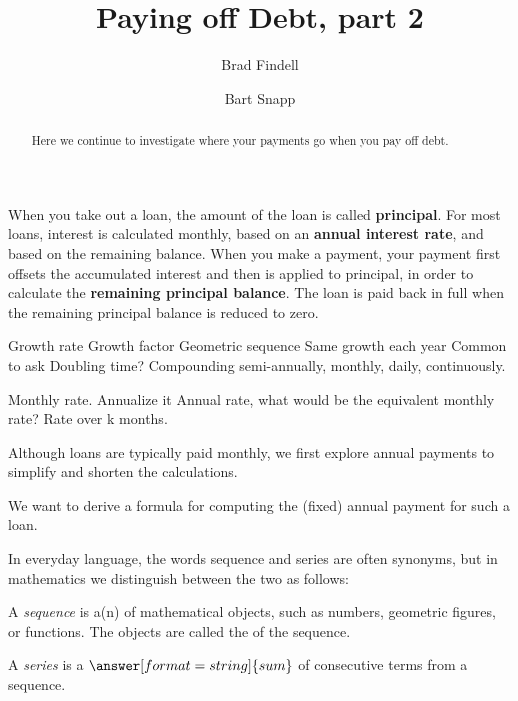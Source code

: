 \documentclass[handout,space,nooutcomes]{ximera}
\title{Paying off Debt, part 2}
\author{Brad Findell \and Bart Snapp}
\begin{document}
\begin{abstract}
Here we continue to investigate where your payments go when you pay off debt.
\end{abstract}
\maketitle

When you take out a loan, the amount of the loan is called
\textbf{principal}.  For most loans, interest is calculated monthly,
based on an \textbf{annual interest rate}, and based on the remaining
balance.  When you make a payment, your payment first offsets the
accumulated interest and then is applied to principal, in order to
calculate the \textbf{remaining principal balance}.  The loan is paid
back in full when the remaining principal balance is reduced to zero.


Growth rate
Growth factor
Geometric sequence
Same growth each year
Common to ask
Doubling time? 
Compounding semi-annually, monthly, daily, continuously.  

Monthly rate.  Annualize it
Annual rate, what would be the equivalent monthly rate? 
Rate over k months. 

 
Although loans are typically paid monthly, we first explore annual payments to simplify and shorten the calculations.  

We want to derive a formula for computing the (fixed) annual payment for such a loan. 




%
% 

\begin{question}
In everyday language, the words sequence and series are often synonyms, but in mathematics we distinguish between the two as follows: 

A \emph{sequence} is a(n)  of mathematical objects, such as numbers, geometric figures, or functions.  
The objects are called the  of the sequence.  

A \emph{series} is a $\answer[format=string]{sum}$ of consecutive terms from a sequence.  

\end{question}
\end{document}
